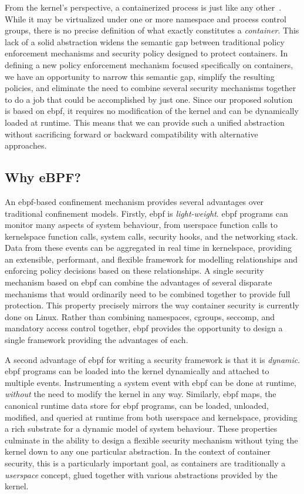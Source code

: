 From the kernel's perspective, a containerized process is just like any
other~\cite{sultan2019_container_security}. While it may be virtualized under one or more
namespace and process control groups, there is no precise definition of what exactly
constitutes a \textit{container}. This lack of a solid abstraction widens the semantic gap
between traditional policy enforcement mechanisms and security policy designed to protect
containers. In defining a new policy enforcement mechanism focused specifically on
containers, we have an opportunity to narrow this semantic gap, simplify the resulting
policies, and eliminate the need to combine several security mechanisms together to do
a job that could be accomplished by just one. Since our proposed solution is based on
\gls{ebpf}, it requires no modification of the kernel and can be dynamically loaded at
runtime.  This means that we can provide such a unified abstraction without sacrificing
forward or backward compatibility with alternative approaches.

\subsection{Why eBPF?}%
\label{ss:why-ebpf}

An \gls{ebpf}-based confinement mechanism provides several advantages over traditional
confinement models.  Firstly, \gls{ebpf} is \textit{light-weight}. \gls{ebpf} programs can monitor
many aspects of system behaviour, from userspace function calls to kernelspace function
calls, system calls, security hooks, and the networking stack. Data from these events can
be aggregated in real time in kernelspace, providing an extensible, performant, and
flexible framework for modelling relationships and enforcing policy decisions based on
these relationships.  A single security mechanism based on \gls{ebpf} can combine the advantages
of several disparate mechanisms that would ordinarily need to be combined together to
provide full protection. This property precisely mirrors the way container security is
currently done on Linux. Rather than combining namespaces, cgroups, seccomp, and mandatory
access control together, \gls{ebpf} provides the opportunity to design a single framework
providing the advantages of each.

A second advantage of \gls{ebpf} for writing a security framework is that it is
\textit{dynamic}. \gls{ebpf} programs can be loaded into the kernel dynamically and attached to
multiple events. Instrumenting a system event with \gls{ebpf} can be done at runtime,
\textit{without} the need to modify the kernel in any way.  Similarly, \gls{ebpf} maps, the
canonical runtime data store for \gls{ebpf} programs, can be loaded, unloaded, modified, and
queried at runtime from both userspace and kernelspace, providing a rich substrate for
a dynamic model of system behaviour. These properties culminate in the ability to design
a flexible security mechanism without tying the kernel down to any one particular
abstraction. In the context of container security, this is a particularly important goal,
as containers are traditionally a \textit{userspace} concept, glued together with various
abstractions provided by the kernel.

